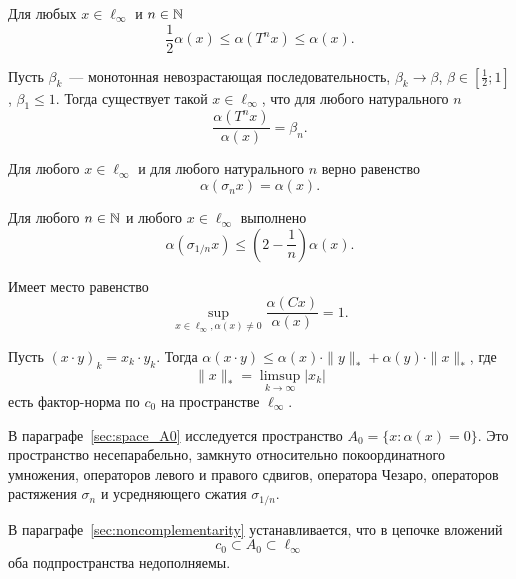 	Для любых $x\in\ell_\infty$ и $n \in \mathbb{N}$
	\begin{equation}\label{est_alpha_Tn_x}
		\frac{1}{2}\alpha(x) \leq \alpha(T^n x) \leq \alpha(x)
		.
	\end{equation}

	Пусть $\beta_k$~--- монотонная невозрастающая последовательность,
	$\beta_k \to \beta$, $\beta\in\left[\frac{1}{2}; 1\right]$, $\beta_1 \leq 1$.
	Тогда существует такой $x\in\ell_\infty$, что для любого натурального $n$
	\begin{equation}
		\frac{\alpha(T^n x)}{\alpha(x)} = \beta_n.
	\end{equation}

	Для любого $x\in\ell_\infty$ и для любого натурального $n$ верно равенство
	\begin{equation}
		\alpha(\sigma_n x) = \alpha(x)
		.
	\end{equation}

	Для любого $n\in\mathbb{N}$ и любого $x\in\ell_\infty$ выполнено
	\begin{equation}
		\alpha(\sigma_{1/n} x) \leq \left( 2- \frac{1}{n} \right) \alpha(x)
		.
	\end{equation}

	Имеет место равенство
	\begin{equation}
		\sup_{x\in\ell_\infty, \alpha(x)\neq 0} \frac{\alpha(Cx)}{\alpha(x)}=1
		.
	\end{equation}

	Пусть $(x\cdot y)_k = x_k\cdot y_k$.
	Тогда
	$\alpha(x\cdot y)\leq \alpha(x)\cdot \|y\|_* + \alpha(y)\cdot \|x\|_*$,
	где
	\begin{equation}
		\|x\|_* = \limsup_{k\to\infty} |x_k|
	\end{equation}
	есть  фактор-норма по $c_0$ на пространстве $\ell_\infty$.

В параграфе~\ref{sec:space_A0} исследуется пространство $A_0 = \{x: \alpha(x) = 0\}$.
Это пространство несепарабельно, замкнуто относительно покоординатного умножения,
операторов левого и правого сдвигов, оператора Чезаро,
операторов растяжения $\sigma_n$ и усредняющего сжатия $\sigma_{1/n}$.

В параграфе~\ref{sec:noncomplementarity} устанавливается, что в цепочке вложений
\begin{equation}
	c_0 \subset A_0 \subset \ell_\infty
\end{equation}
оба подпространства недополняемы.

